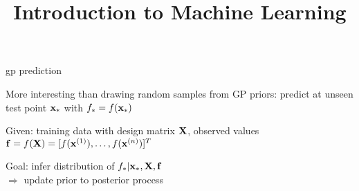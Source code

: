 \documentclass[11pt,compress,t,notes=noshow, xcolor=table]{beamer}
\title{Introduction to Machine Learning}
\begin{document}
\newcommand{\nmk}{\normal(\zero, \Kmat)} %
\newcommand{\nzk}{\normal(\zero, \Kmat)}
\newcommand{\xxtnorm}{\| \xv - \xtil \|}
\newcommand{\kcc}{k(\cdot, \cdot)} 
\newcommand{\kxxt}{k(\xv, \xtil)} %
\newcommand{\Xsubset}{\bm{X}}
\newcommand{\fX}{f(\Xsubset)}
\newcommand{\kXX}{k(\Xsubset, \Xsubset)}
\newcommand{\mX}{m(\Xsubset)}
\newcommand{\gpmk}{\mathcal{GP}(m(\cdot), k(\cdot, \cdot))}
\newcommand{\gpzk}{\mathcal{GP}(\zero, k(\cdot, \cdot))}
\newcommand{\Kmatinv}{\Kmat^{-1}}
\newcommand{\xstar}{\xv_\ast}
\newcommand{\ystar}{\yv_\ast}
\newcommand{\fstar}{\fv_\ast}
\newcommand{\Xstar}{\Xmat_\ast}
\newcommand{\Ky}{\Kmat_y}


\begin{framei}[sep=L]{gp prediction}
\item More interesting than drawing random samples from GP priors: predict at unseen test point $\xstar$ with $f_\ast = f(\xstar)$
\item Given: training data with design matrix $\mathbf{X}$, observed values $\mathbf{f} = f(\mathbf{X}) = [f(\mathbf{x}^{(1)}), \dots, f(\mathbf{x}^{(n)})]^T$
\item Goal: infer distribution of $f_\ast | \xstar, \Xmat, \fv$ \\$\Rightarrow$ update prior to posterior process
\end{framei}
\end{document}
